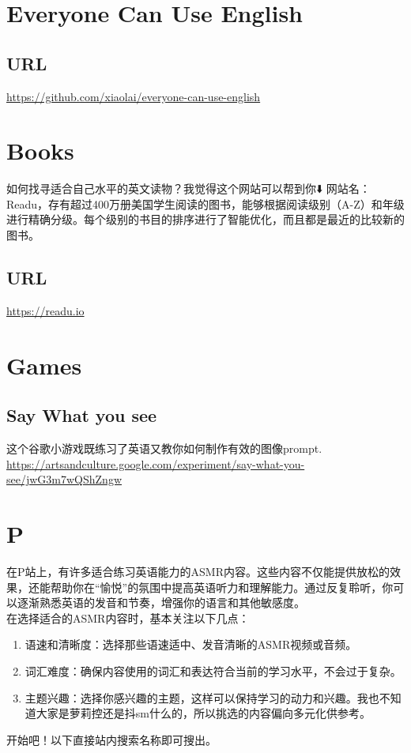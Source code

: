 \documentclass[11pt]{article}
\date{\today}
\title{}
\begin{document}
\tableofcontents

\section{Everyone Can Use English}
\label{sec:org8b76bbe}
\subsection{URL}
\label{sec:org37a3d20}
\url{https://github.com/xiaolai/everyone-can-use-english}
\section{Books}
\label{sec:org02811b0}
如何找寻适合自己水平的英文读物？我觉得这个网站可以帮到你⬇️
网站名：Readu，存有超过400万册美国学生阅读的图书，能够根据阅读级别（A-Z）和年级进行精确分级。每个级别的书目的排序进行了智能优化，而且都是最近的比较新的图书。
\subsection{URL}
\label{sec:orgc7315a8}
\url{https://readu.io}
\section{Games}
\label{sec:org5aa9c9e}
\subsection{Say What you see}
\label{sec:orgb114909}
这个谷歌小游戏既练习了英语又教你如何制作有效的图像prompt. \\
\url{https://artsandculture.google.com/experiment/say-what-you-see/jwG3m7wQShZngw}

\section{P}
\label{sec:org931d7dc}
在P站上，有许多适合练习英语能力的ASMR内容。这些内容不仅能提供放松的效果，还能帮助你在“愉悦”的氛围中提高英语听力和理解能力。通过反复聆听，你可以逐渐熟悉英语的发音和节奏，增强你的语言和其他敏感度。\\
在选择适合的ASMR内容时，基本关注以下几点：
\begin{enumerate}
\item 语速和清晰度：选择那些语速适中、发音清晰的ASMR视频或音频。
\item 词汇难度：确保内容使用的词汇和表达符合当前的学习水平，不会过于复杂。
\item 主题兴趣：选择你感兴趣的主题，这样可以保持学习的动力和兴趣。我也不知道大家是萝莉控还是抖sm什么的，所以挑选的内容偏向多元化供参考。
\end{enumerate}
开始吧！以下直接站内搜索名称即可搜出。
\end{document}
